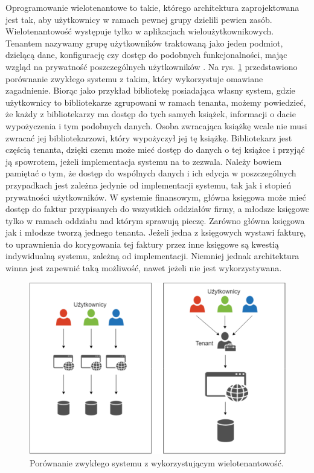 \documentclass[a4paper]{book}
\begin{document}
{Oprogramowanie wielotenantowe to takie, którego architektura zaprojektowana jest tak, aby użytkownicy w ramach pewnej grupy dzielili pewien zasób. Wielotenantowość występuje tylko w aplikacjach wieloużytkownikowych.
Tenantem nazywamy grupę użytkowników traktowaną jako jeden podmiot, dzielącą dane, konfigurację czy dostęp do podobnych funkcjonalności, mając wzgląd na prywatność poszczególnych użytkowników \cite{id:Multitenancy}. Na rys. \ref{id:fig:Multitenancy} przedstawiono porównanie zwykłego systemu z takim, który wykorzystuje omawiane zagadnienie. Biorąc jako przykład bibliotekę posiadająca własny system, gdzie użytkownicy to bibliotekarze zgrupowani w ramach tenanta, możemy powiedzieć, że każdy z bibliotekarzy ma dostęp do tych samych książek, informacji o dacie wypożyczenia i tym podobnych danych. Osoba zwracająca książkę wcale nie musi zwracać jej bibliotekarzowi, który wypożyczył jej tę książkę. Bibliotekarz jest częścią tenanta, dzięki czemu może mieć dostęp do danych o tej książce i przyjąć ją spowrotem, jeżeli implementacja systemu na to zezwala. Należy bowiem pamiętać o tym, że dostęp do wspólnych danych i ich edycja w poszczególnych przypadkach jest zależna jedynie od implementacji systemu, tak jak i stopień prywatności użytkowników. W systemie finansowym, główna księgowa może mieć dostęp do faktur przypisanych do wszystkich oddziałów firmy, a młodsze księgowe tylko w ramach oddziału nad którym sprawują pieczę. Zarówno główna księgowa jak i młodsze tworzą jednego tenanta. Jeżeli jedna z księgowych wystawi fakturę, to uprawnienia do korygowania tej faktury przez inne księgowe są kwestią indywidualną systemu, zależną od implementacji. Niemniej jednak architektura winna jest zapewnić taką możliwość, nawet jeżeli nie jest wykorzystywana.
\begin{figure}
	\centering
	\includegraphics[width=1.0\textwidth]{./img/Multitenancy.pdf}
	\caption{Porównanie zwykłego systemu z wykorzystującym wielotenantowość.}
	\label{id:fig:Multitenancy}
\end{figure}

}
\end{document}
